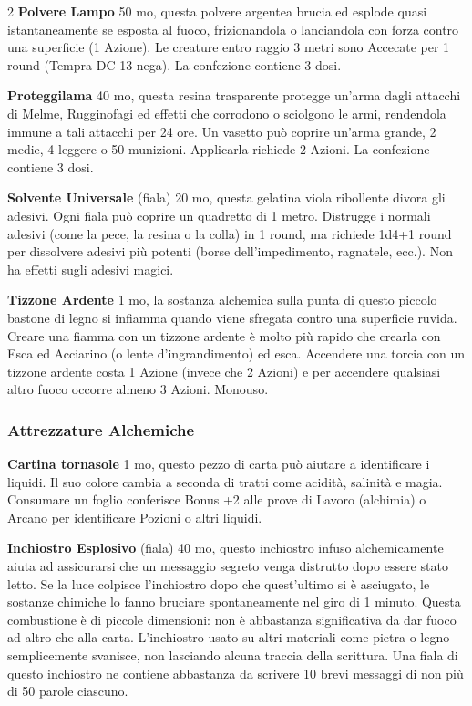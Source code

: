 \begin{multicols}{2}
\textbf{Polvere Lampo} 50 mo, questa polvere argentea brucia ed esplode quasi istantaneamente se esposta al fuoco, frizionandola o lanciandola con forza contro una superficie (1 Azione). Le creature entro raggio 3 metri sono Accecate per 1 round (Tempra DC 13 nega). La confezione contiene 3 dosi.

\textbf{Proteggilama} 40 mo, questa resina trasparente protegge un'arma dagli attacchi di Melme, Rugginofagi ed effetti che corrodono o sciolgono le armi, rendendola immune a tali attacchi per 24 ore. Un vasetto può coprire un'arma grande, 2 medie, 4 leggere o 50 munizioni. Applicarla richiede 2 Azioni. La confezione contiene 3 dosi.

\textbf{Solvente Universale} (fiala) 20 mo, questa gelatina viola ribollente divora gli adesivi. Ogni fiala può coprire un quadretto di 1 metro. Distrugge i normali adesivi (come la pece, la resina o la colla) in 1 round, ma richiede 1d4+1 round per dissolvere adesivi più potenti (borse dell'impedimento, ragnatele, ecc.). Non ha effetti sugli adesivi magici.

\textbf{Tizzone Ardente} 1 mo, la sostanza alchemica sulla punta di questo piccolo bastone di legno si infiamma quando viene sfregata contro una superficie ruvida. Creare una fiamma con un tizzone ardente è molto più rapido che crearla con Esca ed Acciarino (o lente d'ingrandimento) ed esca. Accendere una torcia con un tizzone ardente costa 1 Azione (invece che 2 Azioni) e per accendere qualsiasi altro fuoco occorre almeno 3 Azioni. Monouso.

\subsubsection{Attrezzature Alchemiche}

\textbf{Cartina tornasole} 1 mo, questo pezzo di carta può aiutare a identificare i liquidi. Il suo colore cambia a seconda di tratti come acidità, salinità e magia. Consumare un foglio conferisce Bonus +2 alle prove di Lavoro (alchimia) o Arcano per identificare Pozioni o altri liquidi.

\textbf{Inchiostro Esplosivo} (fiala) 40 mo, questo inchiostro infuso alchemicamente aiuta ad assicurarsi che un messaggio segreto venga distrutto dopo essere stato letto. Se la luce colpisce l'inchiostro dopo che quest'ultimo si è asciugato, le sostanze chimiche lo fanno bruciare spontaneamente nel giro di 1 minuto.
Questa combustione è di piccole dimensioni: non è abbastanza significativa da dar fuoco ad altro che alla carta. L'inchiostro usato su altri materiali come pietra o legno semplicemente svanisce, non lasciando alcuna traccia della scrittura.
Una fiala di questo inchiostro ne contiene abbastanza da scrivere 10 brevi messaggi di non più di 50 parole ciascuno.


\end{multicols}
